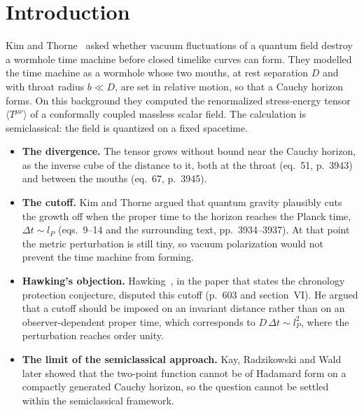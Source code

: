 

\section{Introduction}

Kim and Thorne~\cite{kim1991} asked whether vacuum fluctuations of a quantum field destroy a wormhole time machine before closed timelike curves can form. They modelled the time machine as a wormhole whose two mouths, at rest separation $D$ and with throat radius $b \ll D$, are set in relative motion, so that a Cauchy horizon forms. On this background they computed the renormalized stress-energy tensor $\langle T^{\mu\nu}\rangle$ of a conformally coupled massless scalar field. The calculation is semiclassical: the field is quantized on a fixed spacetime.
\begin{itemize}
\item \textbf{The divergence.} The tensor grows without bound near the Cauchy horizon, as the inverse cube of the distance to it, both at the throat (eq.~51, p.~3943) and between the mouths (eq.~67, p.~3945).
\item \textbf{The cutoff.} Kim and Thorne argued that quantum gravity plausibly cuts the growth off when the proper time to the horizon reaches the Planck time, $\Delta t \sim l_P$ (eqs.~9--14 and the surrounding text, pp.~3934--3937). At that point the metric perturbation is still tiny, so vacuum polarization would not prevent the time machine from forming.
\item \textbf{Hawking's objection.} Hawking~\cite{hawking1992}, in the paper that states the chronology protection conjecture, disputed this cutoff (p.~603 and section~VI). He argued that a cutoff should be imposed on an invariant distance rather than on an observer-dependent proper time, which corresponds to $D\,\Delta t \sim l_P^2$, where the perturbation reaches order unity.
\item \textbf{The limit of the semiclassical approach.} Kay, Radzikowski and Wald~\cite{krw1997} later showed that the two-point function cannot be of Hadamard form on a compactly generated Cauchy horizon, so the question cannot be settled within the semiclassical framework.
\end{itemize}

